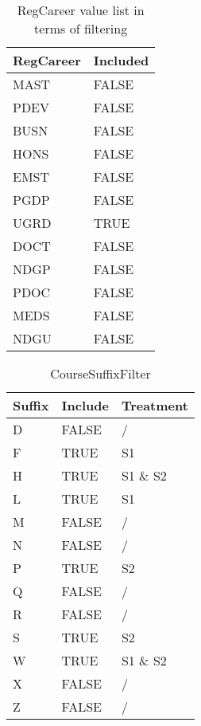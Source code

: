\begin{table}[]
  \centering
  \caption{RegCareer value list in terms of filtering}
  \label{RegCareerFilter}
  \begin{tabular}{ll}
    RegCareer & Included \\ \hline
    MAST      & FALSE    \\
    PDEV      & FALSE    \\
    BUSN      & FALSE    \\
    HONS      & FALSE    \\
    EMST      & FALSE    \\
    PGDP      & FALSE    \\
    UGRD      & TRUE     \\
    DOCT      & FALSE    \\
    NDGP      & FALSE    \\
    PDOC      & FALSE    \\
    MEDS      & FALSE    \\
    NDGU      & FALSE    \\ \hline
  \end{tabular}
\end{table}

\begin{table}[]
  \centering
  \caption{CourseSuffixFilter}
  \label{CourseSuffixFilter}
  \begin{tabular}{lll}
    Suffix & Include & Treatment \\ \hline
    D      & FALSE   & /         \\
    F      & TRUE    & S1        \\
    H      & TRUE    & S1 \& S2  \\
    L      & TRUE    & S1        \\
    M      & FALSE   & /         \\
    N      & FALSE   & /         \\
    P      & TRUE    & S2        \\
    Q      & FALSE   & /         \\
    R      & FALSE   & /         \\
    S      & TRUE    & S2        \\
    W      & TRUE    & S1 \& S2  \\
    X      & FALSE   & /         \\
    Z      & FALSE   & /         \\ \hline
  \end{tabular}
\end{table}

